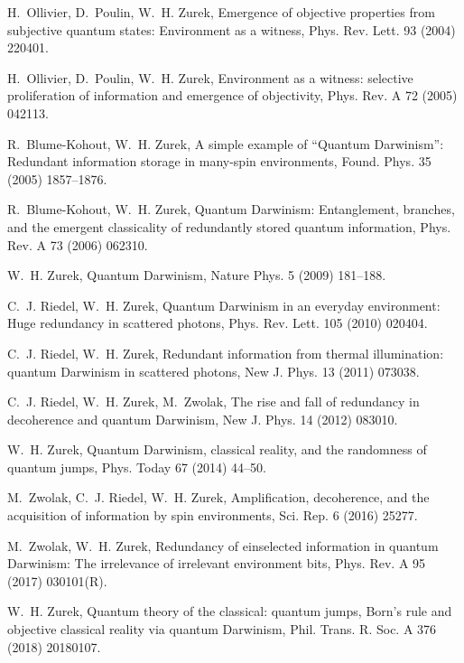 \documentclass[3p,sort&compress,12pt]{elsarticle}
\begin{document}
\begin{thebibliography}{100}
H.~Ollivier, D.~Poulin, W.~H. Zurek, Emergence of objective properties from
  subjective quantum states: {E}nvironment as a witness, Phys. Rev. Lett. 93
  (2004) 220401.

H.~Ollivier, D.~Poulin, W.~H. Zurek, Environment as a witness: selective
  proliferation of information and emergence of objectivity, Phys. Rev. A 72
  (2005) 042113.

R.~Blume-Kohout, W.~H. Zurek, A simple example of ``{Q}uantum {D}arwinism'':
  {R}edundant information storage in many-spin environments, Found. Phys. 35
  (2005) 1857--1876.

R.~Blume-Kohout, W.~H. Zurek, Quantum {D}arwinism: {E}ntanglement, branches,
  and the emergent classicality of redundantly stored quantum information,
  Phys. Rev. A 73 (2006) 062310.

W.~H. Zurek, Quantum {D}arwinism, Nature Phys. 5 (2009) 181--188.

C.~J. Riedel, W.~H. Zurek, Quantum {D}arwinism in an everyday environment: Huge
  redundancy in scattered photons, Phys. Rev. Lett. 105 (2010) 020404.

C.~J. Riedel, W.~H. Zurek, Redundant information from thermal illumination:
  quantum {D}arwinism in scattered photons, New J. Phys. 13 (2011) 073038.

C.~J. Riedel, W.~H. Zurek, M.~Zwolak, The rise and fall of redundancy in
  decoherence and quantum {D}arwinism, New J. Phys. 14 (2012) 083010.

W.~H. Zurek, Quantum {D}arwinism, classical reality, and the randomness of
  quantum jumps, Phys. Today 67 (2014) 44--50.

M.~Zwolak, C.~J. Riedel, W.~H. Zurek, Amplification, decoherence, and the
  acquisition of information by spin environments, Sci. Rep. 6 (2016) 25277.

M.~Zwolak, W.~H. Zurek, Redundancy of einselected information in quantum
  {D}arwinism: {T}he irrelevance of irrelevant environment bits, Phys. Rev. A
  95 (2017) 030101(R).

W.~H. Zurek, Quantum theory of the classical: quantum jumps, {B}orn's rule and
  objective classical reality via quantum {D}arwinism, Phil. Trans. R. Soc. A
  376 (2018) 20180107.


\end{thebibliography}
\end{document}
